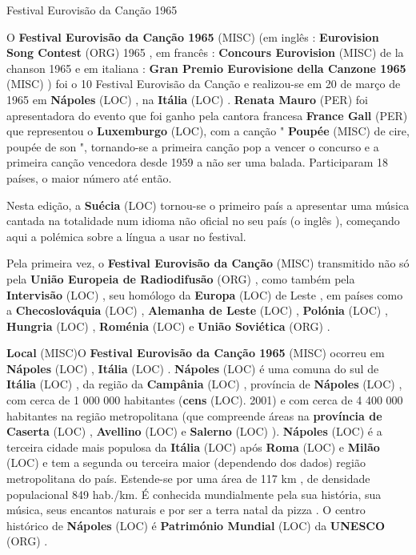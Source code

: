 \documentclass[12pt,a4paper]{article}
\begin{document}
Festival Eurovisão da Canção 1965



O \textbf{Festival Eurovisão da Canção 1965} (MISC) (em inglês : \textbf{Eurovision Song Contest} (ORG) 1965 , em francês : \textbf{Concours Eurovision} (MISC) de la chanson 1965 e em italiana : \textbf{Gran Premio Eurovisione della Canzone 1965} (MISC) ) foi o 10 Festival Eurovisão da Canção e realizou-se em 20 de março de 1965 em \textbf{Nápoles} (LOC) , na \textbf{Itália} (LOC) . \textbf{Renata Mauro} (PER) foi apresentadora do evento que foi ganho pela cantora francesa \textbf{France Gall} (PER) que representou o \textbf{Luxemburgo} (LOC), com a canção " \textbf{Poupée} (MISC) de cire, poupée de son ", tornando-se a primeira canção pop a vencer o concurso e a primeira canção vencedora desde 1959 a não ser uma balada. Participaram 18 países, o maior número até então.

Nesta edição, a \textbf{Suécia} (LOC) tornou-se o primeiro país a apresentar uma música cantada na totalidade num idioma não oficial no seu país (o inglês ), começando aqui a polémica sobre a língua a usar no festival.

Pela primeira vez, o \textbf{Festival Eurovisão da Canção} (MISC) transmitido não só pela \textbf{União Europeia de Radiodifusão} (ORG) , como também pela \textbf{Intervisão} (LOC) , seu homólogo da \textbf{Europa} (LOC) de Leste , em países como a \textbf{Checoslováquia} (LOC) , \textbf{Alemanha de Leste} (LOC) , \textbf{Polónia} (LOC) , \textbf{Hungria} (LOC) , \textbf{Roménia} (LOC) e \textbf{União Soviética} (ORG) .



\textbf{Local} (MISC)O \textbf{Festival Eurovisão da Canção 1965} (MISC) ocorreu em \textbf{Nápoles} (LOC) , \textbf{Itália} (LOC) . \textbf{Nápoles} (LOC) é uma comuna do sul de \textbf{Itália} (LOC) , da região da \textbf{Campânia} (LOC) , província de \textbf{Nápoles} (LOC) , com cerca de 1 000 000 habitantes (\textbf{cens} (LOC). 2001) e com cerca de 4 400 000 habitantes na região metropolitana (que compreende áreas na \textbf{província de Caserta} (LOC) , \textbf{Avellino} (LOC) e \textbf{Salerno} (LOC) ). \textbf{Nápoles} (LOC) é a terceira cidade mais populosa da \textbf{Itália} (LOC) após \textbf{Roma} (LOC) e \textbf{Milão} (LOC) e tem a segunda ou terceira maior (dependendo dos dados) região metropolitana do país. Estende-se por uma área de 117 km , de densidade populacional 849 hab./km. É conhecida mundialmente pela sua história, sua música, seus encantos naturais e por ser a terra natal da pizza . O centro histórico de \textbf{Nápoles} (LOC) é \textbf{Património Mundial} (LOC) da \textbf{UNESCO} (ORG) .
\end{document}
